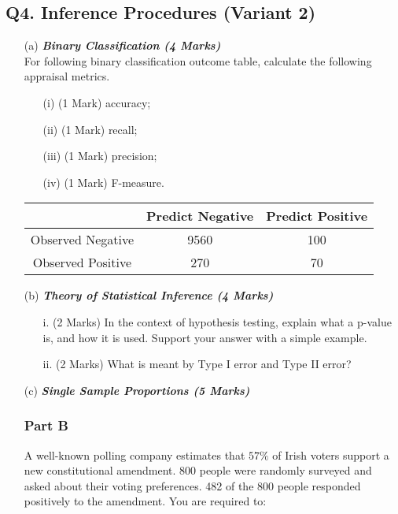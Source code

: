 \documentclass[]{article}
\begin{document}
\subsection*{Q4. Inference Procedures (Variant 2)}

\begin{itemize}
\item[(a)] \textbf{\textit{Binary Classification (4 Marks)}}\\
For following binary classification outcome table, calculate the following appraisal metrics.
\begin{itemize}	
\item[(i)] (1 Mark)	accuracy;
\item[(ii)] (1 Mark)	recall;
\item[(iii)] (1 Mark)	precision;
\item[(iv)] (1 Mark)	F-measure.
\end{itemize}	

\begin{center}
\begin{tabular}{|c|c|c|}
\hline  & \phantom{spa}Predict Negative\phantom{spa} & \phantom{spa}Predict Positive\phantom{spa} \\ 
\hline\phantom{spa} Observed Negative \phantom{spa}&	9560	&	100	\\ 
\hline \phantom{spa}Observed Positive\phantom{spa} & 	270	&	70	\\ 
\hline 
\end{tabular} 
\end{center}

\item[(b)] \textbf{\textit{Theory of Statistical Inference (4 Marks)}}\\
\begin{itemize}
\item[i.](2 Marks) In the context of hypothesis testing, explain what a p-value is, and how it is used. Support your answer with a simple example.
\item[ii.](2 Marks) What is meant by Type I error and Type II error?
\end{itemize}

\item[(c)] \textbf{\textit{Single Sample Proportions (5 Marks)}}\\
\subsubsection*{Part B} %
A well-known polling company estimates that $57\%$ of Irish voters support a new constitutional amendment. 800 people were randomly surveyed and asked about their voting preferences. 482 of the 800 people responded positively to the amendment. You are required to:


\end{itemize}
\end{document}
